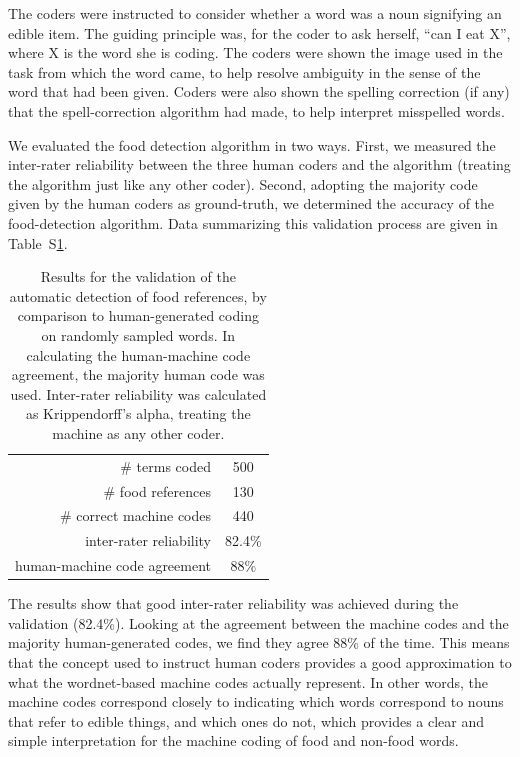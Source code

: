 \documentclass{sigchi}
\begin{document}
The coders were instructed to consider whether a word was a noun signifying
an edible item.  The guiding principle was, for the coder to ask herself,
``can I eat X'', where X is the word she is coding.  The coders were
shown the image used in the task from which the word came, to help resolve ambiguity
in the sense of the word that had been given.  Coders were also shown the 
spelling correction (if any) that the spell-correction algorithm had made,
to help interpret misspelled words.

We evaluated the food detection algorithm in two ways.  First, we measured
the inter-rater reliability between the three human coders and the algorithm
(treating the algorithm just like any other coder).  Second, adopting the 
majority code given by the human coders as ground-truth, we determined the 
accuracy of the food-detection algorithm.  
Data summarizing this validation process are given
in Table~S\ref{table:inter-rater}.

\begin{table}
\centering
\setlength{\tabcolsep}{12pt}
\begin{tabular}{ r | c }
\toprule    
\# terms coded & 500 \\
\# food references & 130 \\
\# correct machine codes & 440 \\
inter-rater reliability & 82.4\% \\
human-machine code agreement & 88\% \\
\bottomrule
\end{tabular}
\caption{
	Results for the validation 
	of the automatic detection of food references, by comparison to
	human-generated coding on randomly sampled words.  In calculating the 
	human-machine code agreement, the majority human code was used.
	Inter-rater reliability was calculated as Krippendorff's alpha, treating
	the machine as any other coder.
}
\label{table:inter-rater}
\end{table}

The results show that good inter-rater reliability was achieved during the
validation (82.4\%).  Looking at the agreement between the 
machine codes and the majority human-generated codes, we find they agree
88\% of the time.  This means that the concept used to instruct human coders
provides a good approximation to what the wordnet-based machine codes actually
represent. In other words, the machine codes correspond closely to indicating
which words correspond to nouns that refer to edible things, and which ones
do not, which provides a clear and simple interpretation for the machine
coding of food and non-food words.
\end{document}
